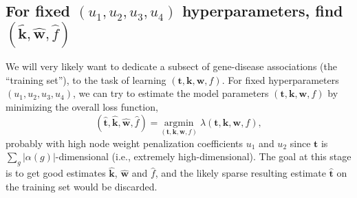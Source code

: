 \documentclass[11pt,notitlepage,english]{article}
\begin{document}
\subsection{For fixed $(u_1,u_2,u_3,u_4)$ hyperparameters, find $(\widehat{\boldsymbol k}, \widehat{\boldsymbol w}, \widehat{f})$}\label{sec:learnwf}
We will very likely want to dedicate a subsect of gene-disease associations (the
``training set''), to the task of learning $({\boldsymbol t}, {\boldsymbol k}, {\boldsymbol w}, f)$.
For fixed hyperparameters $(u_1, u_2, u_3, u_4)$, we can try to
estimate the model parameters $({\boldsymbol t}, {\boldsymbol k}, {\boldsymbol w}, f)$ by
minimizing the overall loss function,
\begin{equation}
  (\widehat{\boldsymbol t}, \widehat{\boldsymbol k}, \widehat{\boldsymbol w}, \widehat{f}) = \underset{({\boldsymbol
      t},{\boldsymbol k},{\boldsymbol w},f)}{\textrm{argmin}} \; \lambda({\boldsymbol t}, {\boldsymbol k},{\boldsymbol w}, f),
  \label{eq:optqw}
\end{equation}
probably with high node weight penalization coefficients $u_1$ and $u_2$ since
${\boldsymbol t}$ is $\sum_g |\alpha(g)|$-dimensional (i.e.,
extremely high-dimensional). The goal at this stage is to get good estimates
$\widehat{\boldsymbol k}$, $\widehat{\boldsymbol w}$ and $\widehat{f}$, and the likely sparse resulting estimate
$\widehat{\boldsymbol t}$ on the training set would be discarded.
\end{document}
